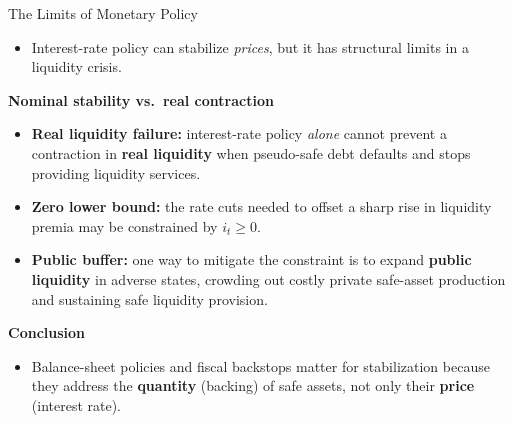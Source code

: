 \documentclass[11pt,aspectratio=169]{beamer}
\begin{document}
\begin{frame}{The Limits of Monetary Policy}
\small
\begin{itemize}
  \item Interest-rate policy can stabilize \textit{prices}, but it has structural limits in a liquidity crisis.
\end{itemize}

\vspace{0.3cm}
\textbf{Nominal stability vs.\ real contraction}
\begin{itemize}
  \item \textbf{Real liquidity failure:} interest-rate policy \emph{alone} cannot prevent a contraction in \textbf{real liquidity} when pseudo-safe debt defaults and stops providing liquidity services.
  \item \textbf{Zero lower bound:} the rate cuts needed to offset a sharp rise in liquidity premia may be constrained by $i_t\ge 0$.
  \item \textbf{Public buffer:} one way to mitigate the constraint is to expand \textbf{public liquidity} in adverse states, crowding out costly private safe-asset production and sustaining safe liquidity provision.
\end{itemize}

\vspace{0.3cm}
\textbf{Conclusion}
\begin{itemize}
  \item Balance-sheet policies and fiscal backstops matter for stabilization because they address the \textbf{quantity} (backing) of safe assets, not only their \textbf{price} (interest rate).
\end{itemize}
\end{frame}
\end{document}
